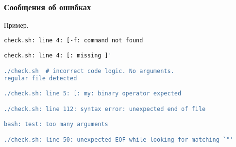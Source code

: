 \begin{frame}[fragile]
	\frametitle{Сообщения об ошибках}

	\begin{block}{Пример.}
		\begin{lstlisting}[language=bash,frame=single]
check.sh: line 4: [-f: command not found 

check.sh: line 4: [: missing ]' 

./check.sh  # incorrect code logic. No arguments.
regular file detected

./check.sh: line 5: [: my: binary operator expected 

./check.sh: line 112: syntax error: unexpected end of file 

bash: test: too many arguments

./check.sh: line 50: unexpected EOF while looking for matching `"'  
\end{lstlisting}
	\end{block}

\end{frame}
